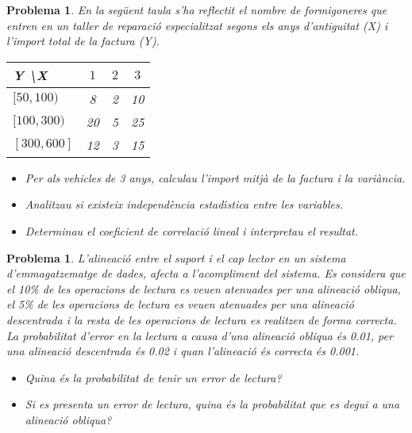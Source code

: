 \documentclass[a4paper,10pt]{article}
\newcounter{prbcont}
\newtheorem{problema}[prbcont]{Problema}
\begin{document}
\begin{problema}
En la seg\"uent taula s'ha reflectit el nombre de formigoneres que entren en un taller de reparaci\'o especialitzat segons els anys d'antiguitat (X) i l'import total de la factura (Y).
\begin{center}
\begin{tabular}{|l||c|c|c|}\hline
Y \textbackslash X & $1$ & $2 $& $3$ \\ \hline \hline
$[50,100)$ & 8 & 2 & 10 \\ \hline
$[100,300)$ & 20 & 5 & 25 \\ \hline
$[300,600]$ & 12 & 3 & 15\\ \hline
\end{tabular}
\end{center}
\begin{itemize}
\item [a)] Per als vehicles de 3 anys, calculau l'import mitj\`a de la factura i la vari\`ancia.
\item [b)] Analitzau si existeix independ\`encia estad\'{\i}stica entre les variables.
\item [c)] Determinau el coeficient de correlaci\'o lineal i interpretau el resultat.
\end{itemize}
\end{problema}

\begin{problema}
L'alineaci\'o entre el suport i el cap lector en un sistema d'emmagatzematge de dades, afecta a l'acompliment del sistema. Es considera que el 10\% de les operacions de lectura es veuen atenuades per una alineaci\'o obliqua, el 5\% de les operacions de lectura es veuen atenuades per una alineaci\'o descentrada i la resta de les operacions de lectura es realitzen de forma correcta. La probabilitat d'error en la lectura a causa d'una alineaci\'o obliqua \'es 0.01, per una alineaci\'o descentrada \'es 0.02 i quan l'alineaci\'o \'es correcta \'es 0.001.
\begin{itemize}
\item [a)] Quina \'es la probabilitat de tenir un error de lectura?
\item [b)] Si es presenta un error de lectura, quina \'es la probabilitat que es degui a una alineaci\'o obliqua?
\end{itemize}
\end{problema}
\end{document}
